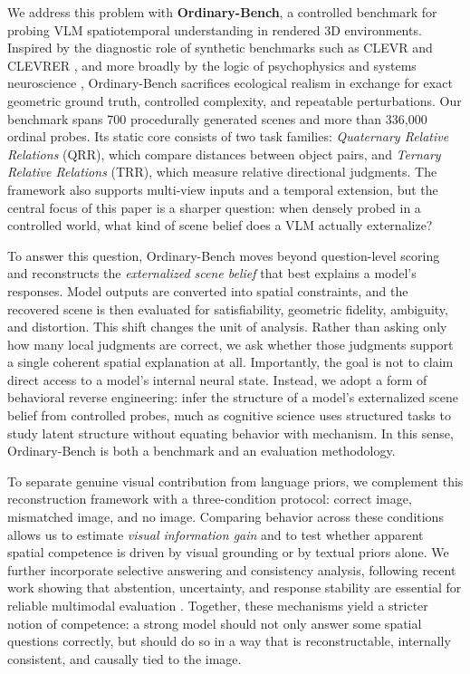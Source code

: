 We address this problem with \textbf{Ordinary-Bench}, a controlled benchmark for probing VLM spatiotemporal understanding in rendered 3D environments. Inspired by the diagnostic role of synthetic benchmarks such as CLEVR and CLEVRER \cite{johnson2017clevr,yi2020clevrer}, and more broadly by the logic of psychophysics and systems neuroscience \cite{kriegeskorte2008rsa,yamins2016dicarlo}, Ordinary-Bench sacrifices ecological realism in exchange for exact geometric ground truth, controlled complexity, and repeatable perturbations. Our benchmark spans 700 procedurally generated scenes and more than 336{,}000 ordinal probes. Its static core consists of two task families: \emph{Quaternary Relative Relations} (QRR), which compare distances between object pairs, and \emph{Ternary Relative Relations} (TRR), which measure relative directional judgments. The framework also supports multi-view inputs and a temporal extension, but the central focus of this paper is a sharper question: when densely probed in a controlled world, what kind of scene belief does a VLM actually externalize?

To answer this question, Ordinary-Bench moves beyond question-level scoring and reconstructs the \emph{externalized scene belief} that best explains a model's responses. Model outputs are converted into spatial constraints, and the recovered scene is then evaluated for satisfiability, geometric fidelity, ambiguity, and distortion. This shift changes the unit of analysis. Rather than asking only how many local judgments are correct, we ask whether those judgments support a single coherent spatial explanation at all. Importantly, the goal is not to claim direct access to a model's internal neural state. Instead, we adopt a form of behavioral reverse engineering: infer the structure of a model's externalized scene belief from controlled probes, much as cognitive science uses structured tasks to study latent structure without equating behavior with mechanism. In this sense, Ordinary-Bench is both a benchmark and an evaluation methodology.

To separate genuine visual contribution from language priors, we complement this reconstruction framework with a three-condition protocol: correct image, mismatched image, and no image. Comparing behavior across these conditions allows us to estimate \emph{visual information gain} and to test whether apparent spatial competence is driven by visual grounding or by textual priors alone. We further incorporate selective answering and consistency analysis, following recent work showing that abstention, uncertainty, and response stability are essential for reliable multimodal evaluation \cite{whitehead2022reliablevqa,eisenschlos2024selectivevqa,khan2024consistency}. Together, these mechanisms yield a stricter notion of competence: a strong model should not only answer some spatial questions correctly, but should do so in a way that is reconstructable, internally consistent, and causally tied to the image.


